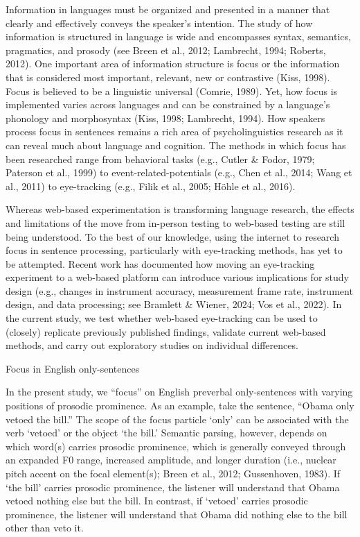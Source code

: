 Information in languages must be organized and presented in a manner that clearly and effectively conveys the speaker’s intention. The study of how information is structured in language is wide and encompasses syntax, semantics, pragmatics, and prosody (see Breen et al., 2012; Lambrecht, 1994; Roberts, 2012). One important area of information structure is focus or the information that is considered most important, relevant, new or contrastive (Kiss, 1998). Focus is believed to be a linguistic universal (Comrie, 1989). Yet, how focus is implemented varies across languages and can be constrained by a language’s phonology and morphosyntax (Kiss, 1998; Lambrecht, 1994). How speakers process focus in sentences remains a rich area of psycholinguistics research as it can reveal much about language and cognition. The methods in which focus has been researched range from behavioral tasks (e.g., Cutler & Fodor, 1979; Paterson et al., 1999) to event-related-potentials (e.g., Chen et al., 2014; Wang et al., 2011) to eye-tracking (e.g., Filik et al., 2005; Höhle et al., 2016).

Whereas web-based experimentation is transforming language research, the effects and limitations of the move from in-person testing to web-based testing are still being understood. To the best of our knowledge, using the internet to research focus in sentence processing, particularly with eye-tracking methods, has yet to be attempted. Recent work has documented how moving an eye-tracking experiment to a web-based platform can introduce various implications for study design (e.g., changes in instrument accuracy, measurement frame rate, instrument design, and data processing; see Bramlett & Wiener, 2024; Vos et al., 2022). In the current study, we test whether web-based eye-tracking can be used to (closely) replicate previously published findings, validate current web-based methods, and carry out exploratory studies on individual differences.

Focus in English only-sentences

In the present study, we “focus” on English preverbal only-sentences with varying positions of prosodic prominence. As an example, take the sentence, “Obama only vetoed the bill.” The scope of the focus particle ‘only’ can be associated with the verb ‘vetoed’ or the object ‘the bill.’ Semantic parsing, however, depends on which word(s) carries prosodic prominence, which is generally conveyed through an expanded F0 range, increased amplitude, and longer duration (i.e., nuclear pitch accent on the focal element(s); Breen et al., 2012; Gussenhoven, 1983).  If ‘the bill’ carries prosodic prominence, the listener will understand that Obama vetoed nothing else but the bill. In contrast, if ‘vetoed’ carries prosodic prominence, the listener will understand that Obama did nothing else to the bill other than veto it. 

